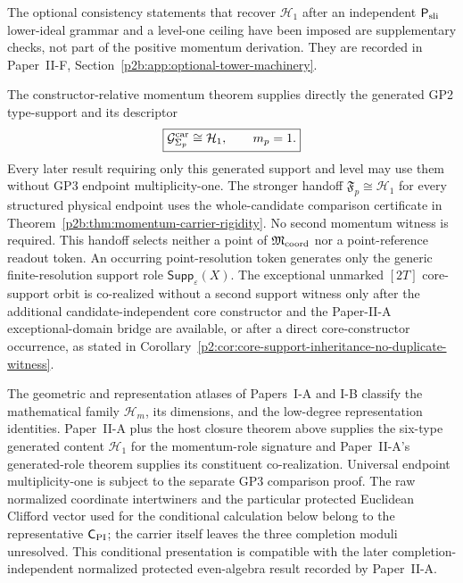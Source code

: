 \documentclass[12pt,a4paper]{article}
\begin{document}
\begin{remark}
The optional consistency statements that recover \(\mathcal H_1\) after an
independent \(\mathsf P_{\rm sli}\) lower-ideal grammar and a level-one
ceiling have been imposed are supplementary checks, not part of the positive
momentum derivation.  They are recorded in
Paper~II-F, Section~\ref{p2b:app:optional-tower-machinery}.
\end{remark}

\begin{corollary}
\label{p2:cor:neutral-level-one-handoff}
The constructor-relative momentum theorem supplies directly the generated
GP2 type-support and its descriptor
\[
 \boxed{\mathcal G^{\rm car}_{\Sigma_p}\cong\mathcal H_1,\qquad m_p=1.}
\]
Every later result requiring only this generated support and level may use
them without GP3 endpoint multiplicity-one.  The stronger handoff
\(\mathfrak F_p\cong\mathcal H_1\) for every structured physical
endpoint uses the whole-candidate comparison certificate in
Theorem~\ref{p2b:thm:momentum-carrier-rigidity}.  No second momentum witness is required.
This handoff selects neither a point of \(\mathfrak M_{\rm coord}\) nor a
point-reference readout token.  An occurring point-resolution token generates
only the generic finite-resolution support role
\(\mathsf{Supp}_{\varepsilon}(X)\).  The exceptional unmarked
\([2T]\) core-support orbit is co-realized without a second support witness
only after the additional candidate-independent core constructor and the
Paper-II-A exceptional-domain bridge are available, or after a direct
core-constructor occurrence, as stated in
Corollary~\ref{p2:cor:core-support-inheritance-no-duplicate-witness}.
\end{corollary}

\begin{remark}
\label{p2:rem:paper1-truncation-data}
The geometric and representation atlases of Papers~I-A and I-B classify the mathematical family \(\mathcal H_m\), its dimensions, and
the low-degree representation identities.  Paper~II-A plus the host
closure theorem above supplies the six-type generated content
\(\mathcal H_1\) for the momentum-role signature and Paper~II-A's
generated-role theorem supplies its constituent co-realization.  Universal
endpoint multiplicity-one is subject to the separate GP3 comparison proof.  The raw normalized coordinate intertwiners and the particular protected
Euclidean Clifford vector used for the conditional calculation below belong to
the representative \(\mathsf C_{\rm PI}\); the carrier itself leaves the three
completion moduli unresolved.  This conditional presentation is compatible
with the later completion-independent normalized protected even-algebra result
recorded by Paper~II-A.
\end{remark}
\end{document}
